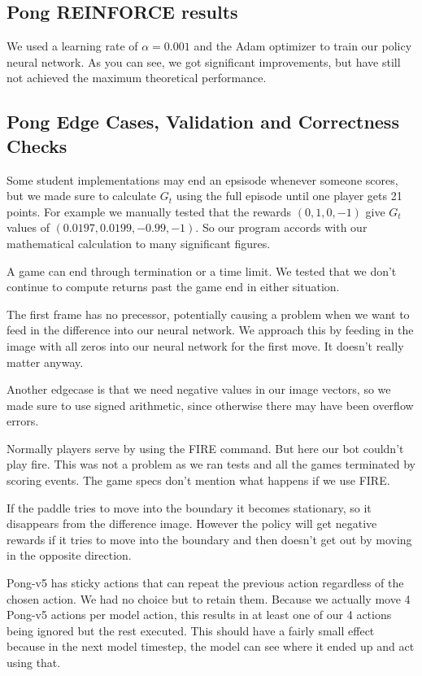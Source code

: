\documentclass{article}
\begin{document}
\subsection{Pong REINFORCE results}

We used a learning rate of $\alpha = 0.001$ and the Adam optimizer to train our policy neural network. As you can see, we got significant improvements, but have still not achieved the maximum theoretical performance.

\subsection{Pong Edge Cases, Validation and Correctness Checks}
Some student implementations may end an epsisode whenever someone scores, but we made sure to calculate $G_t$ using the full episode until one player gets 21 points. For example we manually tested that the rewards $(0,1,0,-1)$ give $G_t$ values of $(0.0197, 0.0199, -0.99, -1)$.  So our program accords with our mathematical calculation to many significant figures. 

A game can end through termination or a time limit. We tested that we don't continue to compute returns past the game end in either situation.

The first frame has no precessor, potentially causing a problem when we want to feed in the difference into our neural network. We approach this by feeding in the image with all zeros into our neural network for the first move. It doesn't really matter anyway.

Another edgecase is that we need negative values in our image vectors, so we made sure to use signed arithmetic, since otherwise there may have been overflow errors.

Normally players serve by using the FIRE command. But here our bot couldn't play fire. This was not a problem as we ran tests and all the games terminated by scoring events. The game specs don't mention what happens if we use FIRE.

If the paddle tries to move into the boundary it becomes stationary, so it disappears from the difference image. However the policy will get negative rewards if it tries to move into the boundary and then doesn't get out by moving in the opposite direction.

Pong-v5 has sticky actions that can repeat the previous action regardless of the chosen action. We had no choice but to retain them. Because we actually move 4 Pong-v5 actions per model action, this results in at least one of our 4 actions being ignored but the rest executed. This should have a fairly small effect because in the next model timestep, the model can see where it ended up and act using that.
\end{document}
